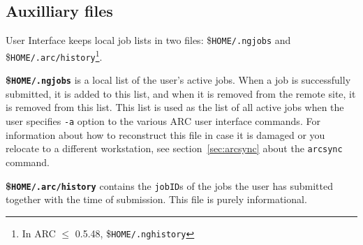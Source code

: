 \subsection{Auxilliary files}\label{sec:joblists}

User Interface keeps local job lists in two files:
{\$}\verb#HOME/.ngjobs# and {\$}\verb#HOME/.arc/history#\footnote{In
  ARC $\leq$ 0.5.48, {\$}\texttt{HOME/.nghistory}}.

\textbf{{\$}\texttt{HOME/.ngjobs}} is a local list of the user's active
jobs. When a job is successfully submitted, it is added to this list,
and when it is removed from the remote site, it is removed from this
list. This list is used as the list of all active jobs when the user
specifies \verb#-a# option to the various ARC user interface commands.
For information about how to reconstruct this file in case it is
damaged or you relocate to a different workstation, see
section~\ref{sec:arcsync} about the \texttt{arcsync} command.

\textbf{{\$}\texttt{HOME/.arc/history}} contains the \texttt{jobID}s of
the jobs the user has submitted together with the time of
submission. This file is purely informational.
